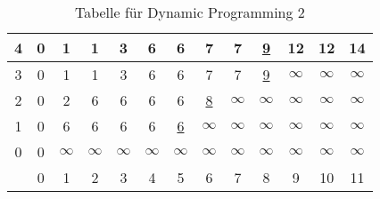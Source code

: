 \documentclass[a4paper]{scrartcl}
\begin{document}
\begin{enumerate}[label=\bfseries \arabic*.]
    \begin{table}[H]
        \centering
        \begin{tabular}[t]{c||c|c|c|c|c|c|c|c|c|c|c|c}
            4 & 0 & 1 & 1 & 3 & 6 & 6 & 7 & 7 & \underline{9} & 12 & 12 & 14 \\ \hline
            3 & 0 & 1 & 1 & 3 & 6 & 6 & 7 & 7 & \underline{9} & $\infty$ & $\infty$ & $\infty$ \\ \hline
            2 & 0 & 2 & 6 & 6 & 6 & 6 & \underline{8} & $\infty$ & $\infty$ & $\infty$ & $\infty$ & $\infty$ \\ \hline
            1 & 0 & 6 & 6 & 6 & 6 & \underline{6} & $\infty$ & $\infty$ & $\infty$ & $\infty$ & $\infty$ & $\infty$ \\ \hline
            0 & 0 & $\infty$ & $\infty$ & $\infty$ & $\infty$ & $\infty$ & $\infty$ & $\infty$ & $\infty$ & $\infty$ & $\infty$ & $\infty$ \\ \hhline{=#=|=|=|=|=|=|=|=|=|=|=|=|}
              & 0 & 1 & 2 & 3 & 4 & 5 & 6 & 7 & 8 & 9 & 10 & 11 \\
        \end{tabular}
        \caption{Tabelle für Dynamic Programming 2}
        \label{tab:dp2}
    \end{table}

\end{enumerate}
\end{document}
